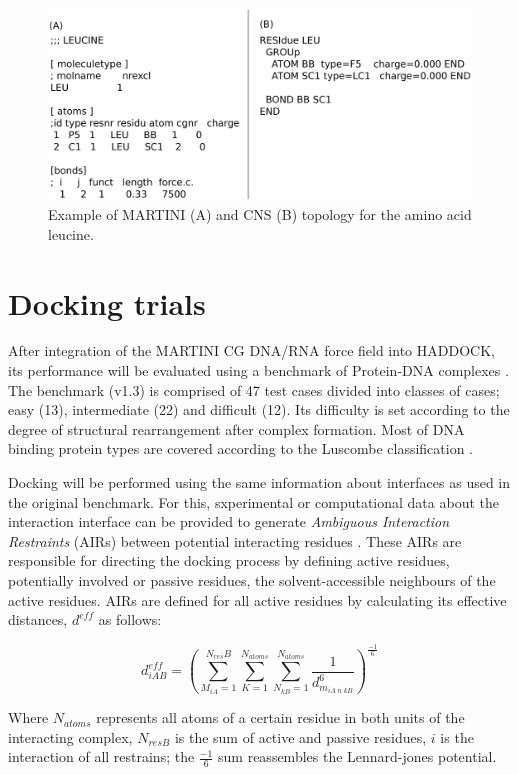 \documentclass[
	12pt,				%
	openright,			%
	twoside,			%
	a4paper,			%
	english,			%
	french,				%
	spanish,			%
	brazil,				%
	]{abntex2}
\begin{document}
\begin{figure}
	\centering
	\includegraphics[width=0.7\linewidth]{figures/file_formats}
	\caption{Example of MARTINI (A) and CNS (B) topology for the amino acid leucine.}
	\label{fig:fileformats}
\end{figure}

\section{Docking trials}

After integration of the MARTINI CG DNA/RNA force field into HADDOCK, its performance will be evaluated using a benchmark of Protein-DNA complexes \cite{vanDijk2008}. The benchmark (v1.3) is comprised of 47 test cases divided into classes of cases; easy (13), intermediate (22) and difficult (12). Its difficulty is set according to the degree of structural rearrangement after complex formation. Most of DNA binding protein types are covered according to the Luscombe classification \cite{Luscombe2000}.

Docking will be performed using the same information about interfaces as used in the original benchmark. For this, 	sxperimental or computational data about the interaction interface can be provided to generate \textit{Ambiguous Interaction Restraints} (AIRs) between potential interacting residues \cite{Dominguez2003}. These AIRs are responsible for directing the docking process by defining active residues, potentially involved or passive residues, the solvent-accessible neighbours of the active residues.  AIRs are defined for all active residues by calculating its effective distances, $d^{eff}$ as follows:

\begin{equation}
d_{iAB}^{eff} =  \left ( \sum_{M_{iA}=1}^{N_{res}B} \sum_{K=1}^{N_{atoms}} \sum_{N_{kB}=1}^{N_{atoms}} \frac{1}{d_{m_{iA\; n\; kB}}^{6}} \right ) ^ \frac{-1}{6}
\label{eq:04}
\end{equation}

Where $N_{atoms}$ represents all atoms of a certain residue in both units of the interacting complex, $N_{resB}$ is the sum of active and passive residues, $i$ is the interaction of all restrains; the $\frac{-1}{6}$ sum reassembles the Lennard-jones potential. 
\end{document}
